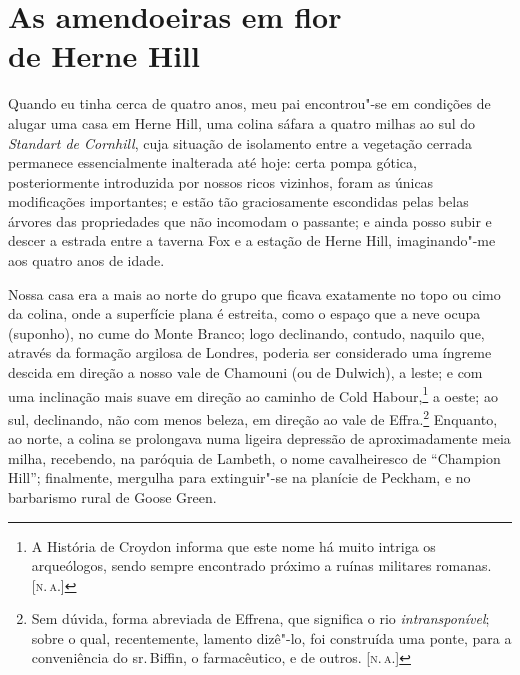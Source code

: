 \chapter*{As amendoeiras em flor\\de Herne Hill} %

Quando eu tinha cerca de quatro anos, meu pai encontrou"-se em
condições de alugar uma casa em Herne Hill, uma colina sáfara a quatro
milhas ao sul do \textit{Standart de Cornhill}, cuja situação de isolamento
entre a vegetação cerrada permanece essencialmente inalterada até hoje:
certa pompa gótica, posteriormente introduzida por nossos ricos
vizinhos, foram as únicas modificações importantes; e estão tão
graciosamente escondidas pelas belas árvores das propriedades que não
incomodam o passante; e ainda posso subir e descer a estrada entre a
taverna Fox e a estação de Herne Hill, imaginando"-me aos quatro anos de
idade.

Nossa casa era a mais ao norte do grupo que ficava exatamente no
topo ou cimo da colina, onde a superfície plana é estreita, como o
espaço que a neve ocupa (suponho), no cume do Monte Branco; logo
declinando, contudo, naquilo que, através da formação argilosa de
Londres, poderia ser considerado uma íngreme descida em direção a nosso
vale de Chamouni (ou de Dulwich), a leste; e com uma inclinação mais
suave em direção ao caminho de Cold Habour,\footnote{A História de
  Croydon informa que este nome há muito intriga os arqueólogos, sendo
  sempre encontrado próximo a ruínas militares romanas. {[}\textsc{n.\,a.}{]}}
a oeste; ao sul, declinando, não com menos beleza, em direção ao vale de
Effra.\footnote{Sem dúvida, forma abreviada de Effrena, que significa o rio
\textit{intransponível}; sobre o qual, recentemente, lamento dizê"-lo, foi
construída uma ponte, para a conveniência do sr.\,Biffin, o farmacêutico,
e de outros. {[}\textsc{n.\,a.}{]}} Enquanto, ao norte, a colina se prolongava numa ligeira
depressão de aproximadamente meia milha, recebendo, na paróquia de
Lambeth, o nome cavalheiresco de ``Champion Hill''; finalmente, mergulha
para extinguir"-se na planície de Peckham, e no barbarismo rural de Goose
Green.

